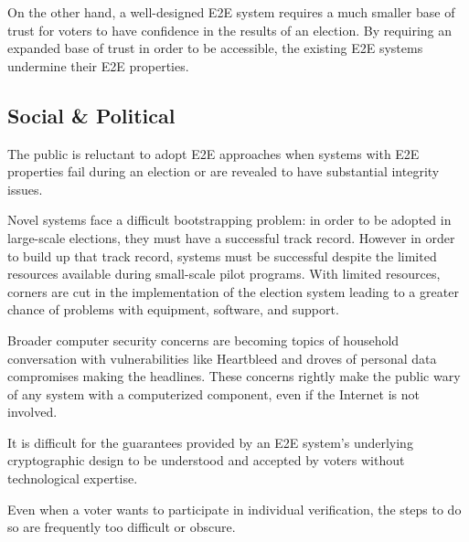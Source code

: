 On the other hand, a well-designed E2E system requires a much smaller
base of trust for voters to have confidence in the results of an
election. By requiring an expanded base of trust in order to be
accessible, the existing E2E systems undermine their E2E properties.

\subsection{Social \& Political}


The public is reluctant to adopt E2E approaches when systems with
E2E properties fail during an election or are revealed to have
substantial integrity issues.

Novel systems face a difficult bootstrapping problem: in order to be
adopted in large-scale elections, they must have a successful track
record. However in order to build up that track record, systems must
be successful despite the limited resources available during
small-scale pilot programs. With limited resources, corners are cut in
the implementation of the election system leading to a greater chance
of problems with equipment, software, and support.

Broader computer security concerns are becoming topics of household
conversation with vulnerabilities like Heartbleed and droves of
personal data compromises making the headlines. These concerns rightly
make the public wary of any system with a computerized component, even
if the Internet is not involved.

It is difficult for the guarantees provided by an E2E system's
underlying cryptographic design to be understood and accepted by
voters without technological expertise.

Even when a voter wants to participate in individual verification, the
steps to do so are frequently too difficult or obscure.


